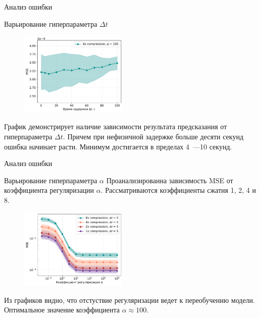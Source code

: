 \documentclass[9pt,pdf]{beamer} %
\begin{document}
\begin{frame}{Анализ ошибки}
\begin{block}{Варьирование гиперпараметра $\Delta t$}
\begin{figure}[h!]
    \centering
    \includegraphics[width=0.46\textwidth]{subs_delta_MSE_dt.pdf}
    \label{MSE_dt_main}
\end{figure}

График демонстрирует наличие зависимости результата предсказания от гиперпараметра $\Delta t$. 
Причем при нефизичной задержке больше десяти секунд ошибка начинает расти. Минимум достигается в пределах 4~---10 секунд.
\end{block}
\end{frame}

\begin{frame}{Анализ ошибки}
\begin{block}{Варьирование гиперпараметра $\alpha$}
Проанализированна зависимость MSE от коэффициента регуляризации $\alpha$.
Рассматриваются коэффициенты сжатия 1, 2, 4 и 8. 
\begin{figure}[h!]
    \centering
    \includegraphics[width=0.46\textwidth]{subs_MSE_alpha.pdf}
    \label{subs_MSE_alpha}
\end{figure}
Из графиков видно, что отстуствие регуляризации ведет к переобучению модели.
Оптимальное значение коэффициента $\alpha \approx 100$.
\end{block}
\end{frame}
\end{document}

